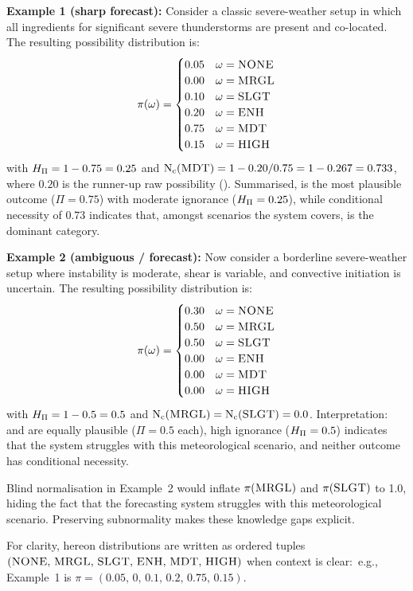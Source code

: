 \textbf{Example 1 (sharp  forecast):}
Consider a classic severe-weather setup in which all ingredients for
significant severe thunderstorms are present and co-located.
The resulting possibility distribution is:
\[
\pi(\omega) = \begin{cases}
0.05 & \omega = \textsc{NONE} \\
0.00 & \omega = \textsc{MRGL} \\
0.10 & \omega = \textsc{SLGT} \\
0.20 & \omega = \textsc{ENH}  \\
0.75 & \omega = \textsc{MDT}  \\
0.15 & \omega = \textsc{HIGH}
\end{cases}
\]
with $H_{\Pi} = 1 - 0.75 = 0.25$ and
$\mathrm{N}_{\mathrm{c}}(\textsc{MDT}) = 1 - 0.20/0.75 = 1 - 0.267 = 0.733$, where $0.20$
is the runner-up raw possibility (). Summarised, 
is the most plausible outcome ($\Pi = 0.75$) with moderate ignorance
($H_{\Pi} = 0.25$), while conditional necessity
of $0.73$ indicates that,
amongst scenarios the system covers,
 is the dominant category.

\textbf{Example 2 (ambiguous / forecast):}
Now consider a borderline severe-weather setup where instability is
moderate, shear is variable, and convective initiation is uncertain.
The resulting possibility distribution is:
\[
\pi(\omega) = \begin{cases}
0.30 & \omega = \textsc{NONE} \\
0.50 & \omega = \textsc{MRGL} \\
0.50 & \omega = \textsc{SLGT} \\
0.00 & \omega = \textsc{ENH}  \\
0.00 & \omega = \textsc{MDT}  \\
0.00 & \omega = \textsc{HIGH}
\end{cases}
\]
with $H_{\Pi} = 1 - 0.5 = 0.5$ and
$\mathrm{N}_{\mathrm{c}}(\textsc{MRGL}) = \mathrm{N}_{\mathrm{c}}(\textsc{SLGT}) = 0.0$. Interpretation:
 and  are equally plausible ($\Pi = 0.5$ each),
high ignorance ($H_{\Pi} = 0.5$) indicates that the system struggles with
this meteorological scenario, and neither outcome has conditional
necessity.

Blind normalisation in Example~2 would inflate $\pi(\textsc{MRGL})$ and
$\pi(\textsc{SLGT})$ to 1.0, hiding the fact that the forecasting system
struggles with this meteorological scenario. Preserving subnormality
makes these knowledge gaps explicit.

For clarity, hereon distributions are written as ordered tuples
$(\textsc{NONE},\, \textsc{MRGL},\, \textsc{SLGT},\, \textsc{ENH},\, \textsc{MDT},\,
\textsc{HIGH})$ when context is clear:\ e.g., Example~1 is
$\pi = (0.05,\, 0,\, 0.1,\, 0.2,\, 0.75,\, 0.15)$.

